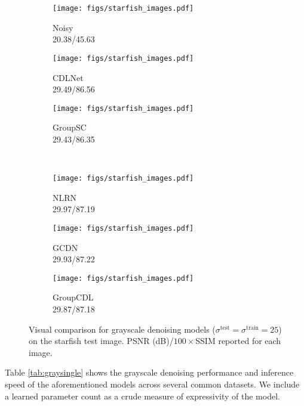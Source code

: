 \documentclass[lettersize,journal]{IEEEtran}
\newcommand{\sigmatrain}{\sigma^{\mathrm{train}}}
\newcommand{\sigmatest}{\sigma^{\mathrm{test}}}
\begin{document}
\begin{figure}[thb]
    \centering
    \captionsetup{justification=centering,singlelinecheck=false}
    \begin{subfigure}{0.31\columnwidth}
    \centering
    \texttt{[image: figs/starfish\_images.pdf]}
    \caption{Noisy \\ 20.38/45.63}
\end{subfigure}\hfill \begin{subfigure}{0.31\columnwidth}
    \centering
    \texttt{[image: figs/starfish\_images.pdf]}
    \caption{CDLNet \cite{janjusevicCDLNet2022} \\ 29.49/86.56}
\end{subfigure}\hfill \begin{subfigure}{0.31\columnwidth}
    \centering
    \texttt{[image: figs/starfish\_images.pdf]}
    \caption{GroupSC \cite{lecouat2020nonlocal} \\ 29.43/86.35}
\end{subfigure}\\
\begin{subfigure}{0.31\columnwidth}
    \centering
    \texttt{[image: figs/starfish\_images.pdf]}
    \caption{NLRN \cite{liu2018non} \\ 29.97/87.19}
\end{subfigure}\hfill \begin{subfigure}{0.31\columnwidth}
    \centering
    \texttt{[image: figs/starfish\_images.pdf]}
    \caption{GCDN \cite{Valsesia2020} \\ 29.93/87.22}
\end{subfigure}\hfill \begin{subfigure}{0.31\columnwidth}
    \centering
    \texttt{[image: figs/starfish\_images.pdf]}
    \caption{GroupCDL \\ 29.87/87.18}
\end{subfigure}      \captionsetup{justification=justified,singlelinecheck=false}
    \caption{
        Visual comparison for grayscale denoising models
        ($\sigmatest=\sigmatrain=25$) on the starfish test image. PSNR (dB)/$100 \times$SSIM reported for each image.
    }
    \label{fig:graysingle}
\end{figure}
Table \ref{tab:graysingle} shows the grayscale
denoising performance and inference speed of the aforementioned models across
several common datasets. We
include a learned parameter count as a crude measure of expressivity of the model.
\end{document}
